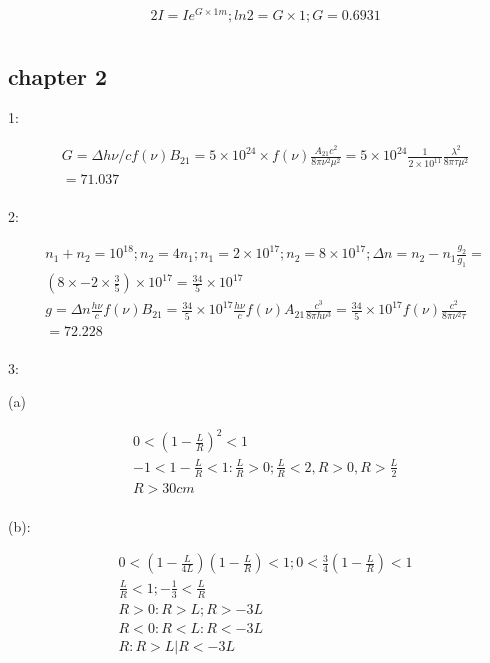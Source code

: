 \documentclass{article}
\begin{document}
\begin{align*}
&2I=Ie^{G \times 1m};ln2=G\times 1;G=0.6931\\
\end{align*}

\subsection{chapter 2}

1:

\begin{align*}
  &G= \Delta h\nu/cf(\nu)B_{21}=5 \times 10^{24} \times  f(\nu)\frac{A_{21}c^2}{8\pi \nu^2\mu^2}=5 \times 10^{24}\frac1{2 \times 10^{11}}\frac{\lambda^2}{8\pi\tau\mu^2}\\
  &=71.037\\
\end{align*}

2:

\begin{align*}
&n_1+n_2=10^{18};n_2=4n_1;n_1=2 \times 10^{17};n_2=8 \times 10^{17};\Delta n=n_2-n_1\frac{g_2}{g_1}=\\
&(8 \times -2 \times \frac{3}5) \times 10^{17}=\frac{34}5 \times 10^{17}\\
&g= \Delta n\frac{h\nu}{c}f(\nu)B_{21}=\frac{34}5 \times 10^{17} \frac{h\nu}cf(\nu)A_{21}\frac{c^3}{8\pi h\nu^3}=\frac{34}5 \times 10^{17}f(\nu)\frac{c^2}{8\pi\nu^2\tau}\\
&=72.228\\
\end{align*}

3:

(a)

\begin{align*}
&0<(1-\frac{L}{R})^2<1\\
&-1<1-\frac LR<1:\frac LR>0;\frac LR<2,R>0,R>\frac L2\\
&R>30cm\\
\end{align*}

(b):

\begin{align*}
&0<(1-\frac{L}{4L})(1-\frac LR)<1;0<\frac34(1-\frac LR)<1\\
&\frac LR<1;-\frac13<\frac LR \\
&R>0:R>L;R>-3L\\
&R<0:R<L:R<-3L\\
&R:R>L | R<-3L\\
\end{align*}
\end{document}
